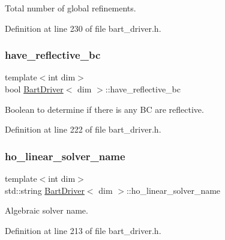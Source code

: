 Total number of global refinements. 



Definition at line 230 of file bart\+\_\+driver.\+h.

\mbox{\label{class_bart_driver_ad42739169c4b4b97014c53a616f2d1ee}} 
\subsubsection{\texorpdfstring{have\+\_\+reflective\+\_\+bc}{have\_reflective\_bc}}
{\footnotesize\ttfamily template$<$int dim$>$ \\
bool \hyperlink{class_bart_driver}{Bart\+Driver}$<$ dim $>$\+::have\+\_\+reflective\+\_\+bc\hspace{0.3cm}{\ttfamily [private]}}



Boolean to determine if there is any BC are reflective. 



Definition at line 222 of file bart\+\_\+driver.\+h.

\mbox{\label{class_bart_driver_a7dcefb31d64ad2e76d4c04a44cb26f7c}} 
\subsubsection{\texorpdfstring{ho\+\_\+linear\+\_\+solver\+\_\+name}{ho\_linear\_solver\_name}}
{\footnotesize\ttfamily template$<$int dim$>$ \\
std\+::string \hyperlink{class_bart_driver}{Bart\+Driver}$<$ dim $>$\+::ho\+\_\+linear\+\_\+solver\+\_\+name\hspace{0.3cm}{\ttfamily [private]}}



Algebraic solver name. 



Definition at line 213 of file bart\+\_\+driver.\+h.

\mbox{\label{class_bart_driver_a0662a7c4208dc352aec9adf789edb463}} 
